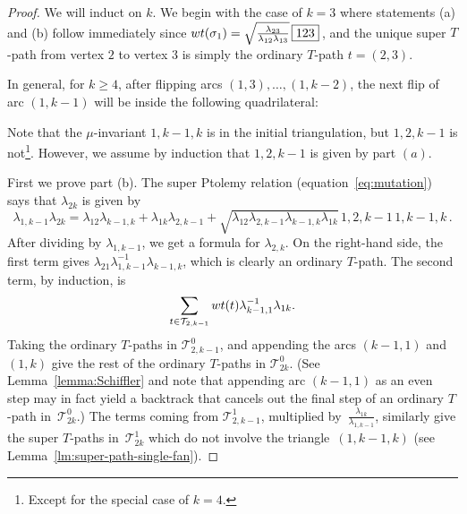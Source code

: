 \documentclass[11pt]{article}
\numberwithin{equation}{section}
\newcommand{\midarrow}{\tikz \draw[-triangle 90] (0,0) -- +(.1,0);}
\numberwithin{equation}{section}
\begin{document}
\begin{proof}
 We will induct on $k$. We begin with the case of $k=3$ where statements (a) and (b) follow immediately since
 ${\rm wt}(\sigma_1) = \sqrt{\frac{\lambda_{23}}{\lambda_{12}\lambda_{13}}} \, \boxed{123}$\,, and the unique super $T$-path from vertex $2$ to vertex $3$
 is simply the ordinary $T$-path $t = (2,3)$.

 In general, for $k\geq 4$, after flipping arcs $(1,3),\dots,(1,k-2)$, the next flip of arc $(1,k-1)$ will be inside the following quadrilateral:
 \begin{center}
 \end{center}
 Note that the $\mu$-invariant $\boxed{1,k-1,k}$ is in the initial triangulation, but $\boxed{1,2,k-1}$ is not\footnote{Except for the special case of $k=4$.}.
 However, we assume by induction that $\boxed{1,2,k-1}$ is given by part $(a)$.

 First we prove part (b).
 The super Ptolemy relation (equation~\eqref{eq:mutation}) says that $\lambda_{2k}$ is given by
 \[
 \lambda_{1,k-1}\lambda_{2k} = \lambda_{12}\lambda_{k-1,k} + \lambda_{1k}\lambda_{2,k-1}
 + \sqrt{\lambda_{12}\lambda_{2,k-1}\lambda_{k-1,k}\lambda_{1k}} \, \boxed{1,2,k-1} \, \boxed{1,k-1,k}\,.
 \]
 After dividing by $\lambda_{1,k-1}$, we get a formula for $\lambda_{2,k}$. On the right-hand side, the first term gives
 $\lambda_{21}\lambda_{1,k-1}^{-1}\lambda_{k-1,k}$, which is clearly an ordinary $T$-path. The second term, by induction, is
 \[ \sum_{t \in \mathcal{T}_{2,k-1}} {\rm wt}(t) \lambda_{k-1,1}^{-1} \lambda_{1k}. \]
 Taking the ordinary $T$-paths in $\mathcal{T}^0_{2,k-1}$, and appending the arcs $(k-1,1)$ and $(1,k)$ give the rest of the ordinary $T$-paths
 in $\mathcal{T}^0_{2k}$. (See Lemma~\ref{lemma:Schiffler} and note that appending arc $(k-1,1)$ as an even step may in fact yield a backtrack that cancels out the final step of an ordinary $T$-path in~$\mathcal{T}^0_{2k}$.) The terms coming from $\mathcal{T}^1_{2,k-1}$, multiplied by~$\frac{\lambda_{1k}}{\lambda_{1,k-1}}$, similarly give the super $T$-paths
 in~$\mathcal{T}^1_{2k}$ which do not involve the triangle~$(1,k-1,k)$ (see Lemma~\ref{lm:super-path-single-fan}).


\end{proof}
\end{document}
